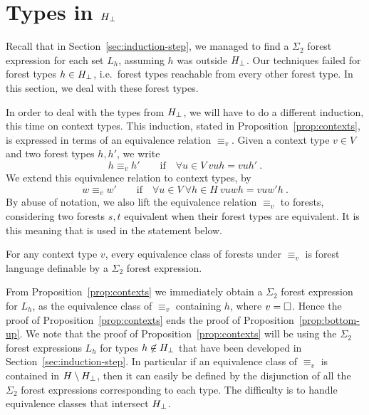 \documentclass{LMCS}
\begin{document}
\section{Types in \texorpdfstring{${H_\bot}$}{Hbot}}
\label{sec:top-down}

\def\ordereq{\sim}
\def\order{\leq}

Recall that in Section~\ref{sec:induction-step}, we managed to find a
$\Sigma_2$ forest expression for each set $L_h$, assuming $h$ was
outside ${H_\bot}$. Our techniques failed for forest types $h \in
{H_\bot}$, i.e.~forest types reachable from every other forest type.
In this section, we deal with these forest types.

In order to deal with the types from ${H_\bot}$, we will have to do a different
induction, this time on context types.  This induction, stated in 
Proposition~\ref{prop:contexts}, is expressed in terms of an equivalence
relation $\equiv_v$.  Given a context type $v \in V$ and two forest
types $h,h'$, we write 
\begin{equation}
  \label{eq:equiv-forest}
  h \equiv_v h' \qquad \mbox{if} \quad \forall u \in V \ vuh = vuh'\ .
\end{equation}
We extend this equivalence relation to context types, by
\begin{equation}
  \label{eq:equiv-context}
  w \equiv_v w' \qquad \mbox{if} \quad \forall u \in V\  \forall h \in
  H\ vuwh = vuw'h\ .
\end{equation}
By abuse of notation, we also lift the equivalence relation $\equiv_v$
to forests, considering two forests $s,t$ equivalent when their forest
types are equivalent. It is this meaning that is used in the statement
below.
\begin{prop}\label{prop:contexts}
  For any context type $v$, every equivalence class of forests under
  $\equiv_v$ is forest language definable by a $\Sigma_2$ forest
  expression.
\end{prop}

From Proposition~\ref{prop:contexts} we immediately obtain a
$\Sigma_2$ forest expression for $L_h$, as the equivalence class of
$\equiv_v$ containing $h$, where $v=\Box$.  Hence the proof of
Proposition~\ref{prop:contexts} ends the proof of
Proposition~\ref{prop:bottom-up}.  We note that the proof of
Proposition~\ref{prop:contexts} will be using the $\Sigma_2$ forest
expressions $L_h$ for types $h \not\in {H_\bot}$ that have been developed
in Section~\ref{sec:induction-step}. In particular if an equivalence
class of $\equiv_v$ is contained in $H \setminus {H_\bot}$, then it can easily
be defined by the disjunction of all the $\Sigma_2$ forest expressions
corresponding to each type. The difficulty is to handle equivalence
classes that intersect ${H_\bot}$.
\end{document}
